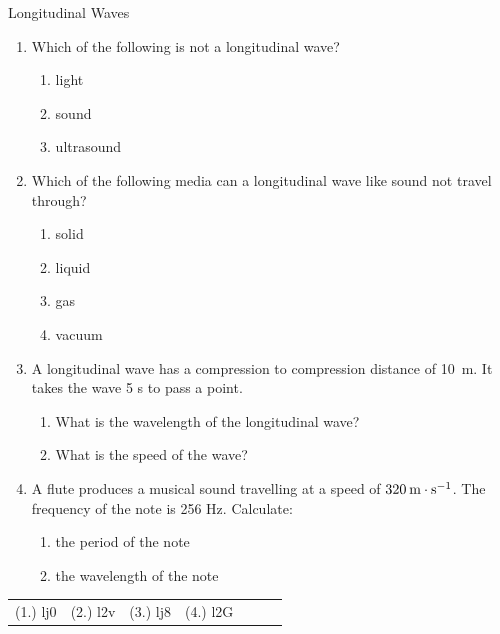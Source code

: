 \begin{eocexercises}{Longitudinal Waves}
            \nopagebreak
      \label{m38783*id293753}\begin{enumerate}[noitemsep, label=\textbf{\arabic*}. ] 
            \label{m38783*uid27}\item Which of the following is not a longitudinal wave?
\label{m38783*id293768}\begin{enumerate}[noitemsep, label=\textbf{\alph*}. ] 
\label{m38783*uid29}\item light
\label{m38783*uid30}\item sound
\label{m38783*uid31}\item ultrasound
\end{enumerate}
                \label{m38783*uid32}\item Which of the following media can a longitudinal wave like sound not travel through?
\label{m38783*id293834}\begin{enumerate}[noitemsep, label=\textbf{\alph*}. ] 
            \label{m38783*uid33}\item solid
\label{m38783*uid34}\item liquid
\label{m38783*uid35}\item gas
\label{m38783*uid36}\item vacuum
\end{enumerate}
                
    \par
          \label{m38783*uid38}\item A longitudinal wave has a compression to compression distance of 10~m. It takes the wave 5 s to pass a point.
\label{m38783*id294078}\begin{enumerate}[noitemsep, label=\textbf{\alph*}. ] 
            \label{m38783*uid39}\item What is the wavelength of the longitudinal wave?
\label{m38783*uid40}\item What is the speed of the wave?
\end{enumerate}
                \label{m38783*uid41}\item A flute produces a musical sound travelling at a speed of $320\phantom{\rule{2pt}{0ex}}\text{m}\ensuremath{\cdot}\text{s}{}^{-1}$. The frequency of the note is 256 Hz. Calculate:
\label{m38783*id294137}\begin{enumerate}[noitemsep, label=\textbf{\alph*}. ] 
            \label{m38783*uid42}\item the period of the note
\label{m38783*uid43}\item the wavelength of the note
\end{enumerate}
                \end{enumerate}
  \label{m38783**end}
  \label{e91550bed2a1600e0ddb2572d580bf8e**end}
\par \practiceinfo
 \par \begin{tabular}[h]{cccccc}
 (1.) lj0  &  (2.) l2v  &  (3.) lj8  &  (4.) l2G  &    &    &    & \end{tabular}
\end{eocexercises}
